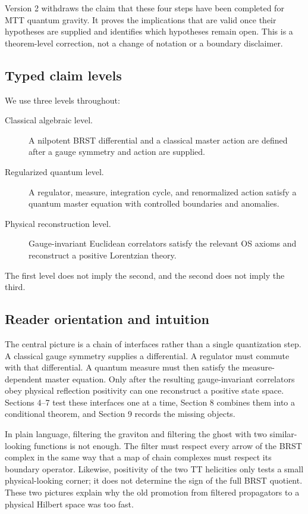 \documentclass[11pt]{article}
\begin{document}
Version 2 withdraws the claim that these four steps have been completed for
MTT quantum gravity.  It proves the implications that are valid once their
hypotheses are supplied and identifies which hypotheses remain open.  This is
a theorem-level correction, not a change of notation or a boundary disclaimer.

\subsection{Typed claim levels}

We use three levels throughout:
\begin{description}
\item[Classical algebraic level.] A nilpotent BRST differential and a classical
master action are defined after a gauge symmetry and action are supplied.
\item[Regularized quantum level.] A regulator, measure, integration cycle, and
renormalized action satisfy a quantum master equation with controlled
boundaries and anomalies.
\item[Physical reconstruction level.] Gauge-invariant Euclidean correlators
satisfy the relevant OS axioms and reconstruct a positive Lorentzian theory.
\end{description}
The first level does not imply the second, and the second does not imply the
third.

\subsection{Reader orientation and intuition}

The central picture is a chain of interfaces rather than a single quantization
step.  A classical gauge symmetry supplies a differential.  A regulator must
commute with that differential.  A quantum measure must then satisfy the
measure-dependent master equation.  Only after the resulting gauge-invariant
correlators obey physical reflection positivity can one reconstruct a positive
state space.  Sections 4--7 test these interfaces one at a time, Section 8
combines them into a conditional theorem, and Section 9 records the missing
objects.

In plain language, filtering the graviton and filtering the ghost with two
similar-looking functions is not enough.  The filter must respect every arrow
of the BRST complex in the same way that a map of chain complexes must respect
its boundary operator.  Likewise, positivity of the two TT helicities only
tests a small physical-looking corner; it does not determine the sign of the
full BRST quotient.  These two pictures explain why the old promotion from
filtered propagators to a physical Hilbert space was too fast.
\end{document}
